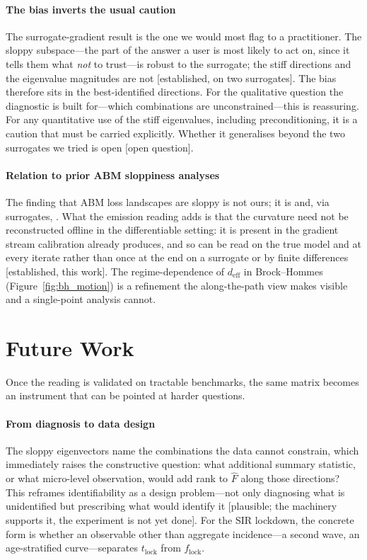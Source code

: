 \documentclass[10pt,twocolumn]{article}
\newcommand{\Fhat}{\hat{F}}
\newcommand{\deff}{d_{\mathrm{eff}}}
\newcommand{\est}[1]{\textup{\textsf{\footnotesize[#1]}}}
\begin{document}
\paragraph{The bias inverts the usual caution}
The surrogate-gradient result is the one we would most flag to a practitioner. The
sloppy subspace---the part of the answer a user is most likely to act on, since it
tells them what \emph{not} to trust---is robust to the surrogate; the stiff
directions and the eigenvalue magnitudes are not \est{established, on two surrogates}.
The bias therefore sits in the best-identified directions. For the qualitative
question the diagnostic is built for---which combinations are unconstrained---this is
reassuring. For any quantitative use of the stiff eigenvalues, including
preconditioning, it is a caution that must be carried explicitly. Whether it
generalises beyond the two surrogates we tried is open \est{open question}.

\paragraph{Relation to prior ABM sloppiness analyses}
The finding that ABM loss landscapes are sloppy is not ours; it is
\citet{naumann2024exploration} and, via surrogates, \citet{scarrold2024computing}.
What the emission reading adds is that the curvature need not be reconstructed offline
in the differentiable setting: it is present in the gradient stream calibration
already produces, and so can be read on the true model and at every iterate rather
than once at the end on a surrogate or by finite differences \est{established, this
work}. The regime-dependence of $\deff$ in Brock--Hommes
(Figure~\ref{fig:bh_motion}) is a refinement the along-the-path view makes visible and
a single-point analysis cannot.

\section{Future Work}
\label{sec:future}

Once the reading is validated on tractable benchmarks, the same matrix becomes an
instrument that can be pointed at harder questions.

\paragraph{From diagnosis to data design}
The sloppy eigenvectors name the combinations the data cannot constrain, which
immediately raises the constructive question: what additional summary statistic, or
what micro-level observation, would add rank to $\Fhat$ along those directions? This
reframes identifiability as a design problem---not only diagnosing what is
unidentified but prescribing what would identify it \est{plausible; the machinery
supports it, the experiment is not yet done}. For the SIR lockdown, the concrete form
is whether an observable other than aggregate incidence---a second wave, an
age-stratified curve---separates $t_{\mathrm{lock}}$ from $f_{\mathrm{lock}}$.
\end{document}
